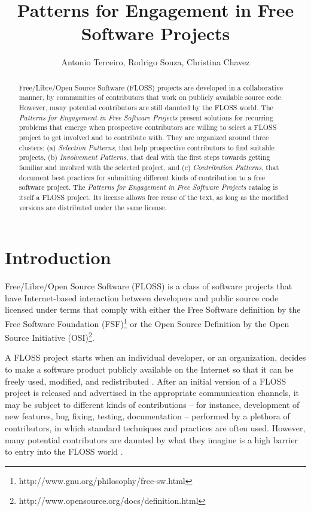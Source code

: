 \documentclass[12pt]{article}
\title{Patterns for Engagement in Free Software Projects}
\author{Antonio Terceiro\inst{1}, Rodrigo Souza\inst{2}, Christina Chavez\inst{3}}
\begin{document}
\maketitle

\begin{abstract}
Free/Libre/Open Source Software (FLOSS) projects are developed in a collaborative manner, 
by communities of contributors that work on publicly available source code.
However, many potential contributors are still daunted by the FLOSS world.
The \textit{Patterns for Engagement in Free Software Projects} 
present solutions for recurring problems that emerge when
prospective contributors are willing to select a FLOSS project
to get involved and to contribute with.
They are organized around three clusters: 
(a) \textit{Selection Patterns}, that help prospective contributors to find suitable projects, 
(b) \textit{Involvement Patterns}, that deal with the first steps towards 
getting familiar and involved with the selected project, and 
(c) \textit{Contribution Patterns}, that document best practices for submitting 
different kinds of contribution to a free software project. 
The \textit{Patterns for Engagement in Free Software Projects} catalog is itself a FLOSS project. 
Its license allows free reuse of the text, as long as the modified versions 
are distributed under the same license.
\end{abstract}

\section{Introduction}

Free/Libre/Open Source Software (FLOSS) is a class of software projects
that have Internet-based interaction between developers and public
source code licensed under terms that comply with either the Free
Software definition by the Free Software Foundation
(FSF)\footnote{http://www.gnu.org/philosophy/free-sw.html} or the Open
Source Definition by the Open Source Initiative
(OSI)\footnote{http://www.opensource.org/docs/definition.html}.

A FLOSS project starts when an individual developer, or an organization,
decides to make a software product publicly available on the Internet so that
it can be freely used, modified, and redistributed \cite{kon2011}.
After an initial version of a FLOSS project is released and advertised in 
the appropriate communication channels, it may be subject to 
different kinds of contributions 
-- for instance, development of new features, bug fixing, testing, documentation --
performed by a plethora of contributors, 
in which standard techniques and practices are often used.
However, many potential contributors are daunted by 
what they imagine is a high barrier to entry into the FLOSS world \cite{lester2012}.
\end{document}
